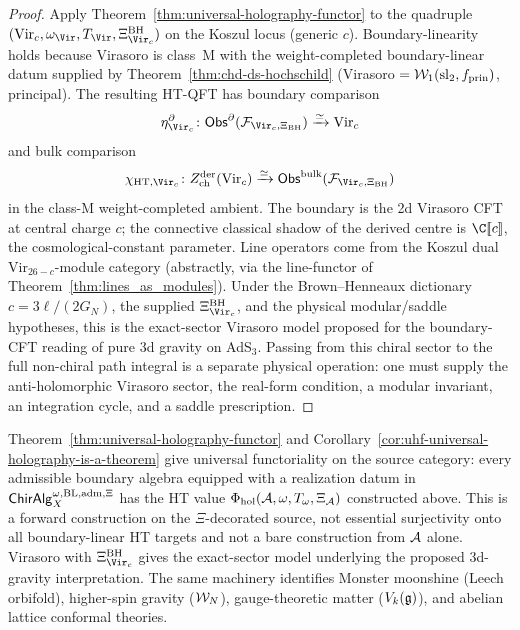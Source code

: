 \begin{proof}
Apply Theorem~\ref{thm:universal-holography-functor} to the
quadruple
\((\mathrm{Vir}_c,\omega_{\Vir},T_{\Vir},
\Xi_{\Vir_c}^{\mathrm{BH}})\) on the Koszul locus (generic \(c\)).
Boundary-linearity holds because Virasoro is class~M with the
weight-completed boundary-linear datum supplied by
Theorem~\ref*{thm:chd-ds-hochschild}
(Virasoro \(=\mathcal{W}_1(\mathrm{sl}_2,f_{\mathrm{prin}})\), principal).
The resulting HT-QFT has boundary comparison
\[
\eta^\partial_{\Vir_c}\colon
\Obs^\partial(\cF_{\Vir_c,\Xi_{\mathrm{BH}}})
\xrightarrow{\simeq}\mathrm{Vir}_c
\]
and bulk comparison
\[
\chi_{\mathrm{HT},\Vir_c}\colon
\Zder(\mathrm{Vir}_c)\xrightarrow{\simeq}
\Obs^{\mathrm{bulk}}(\cF_{\Vir_c,\Xi_{\mathrm{BH}}})
\]
in the class-M weight-completed ambient. The boundary is the 2d
Virasoro CFT at central charge \(c\); the connective classical shadow
of the derived centre is \(\C[\![c]\!]\), the cosmological-constant
parameter. Line operators come from the Koszul dual
\(\mathrm{Vir}_{26-c}\)-module category (abstractly, via the
line-functor of Theorem~\ref*{thm:lines_as_modules}). Under the
Brown--Henneaux dictionary \(c = 3\ell/(2G_N)\), the supplied
\(\Xi_{\Vir_c}^{\mathrm{BH}}\), and the physical modular/saddle
hypotheses, this is the exact-sector Virasoro model proposed for the
boundary-CFT reading of pure 3d gravity on AdS$_3$.  Passing from this
chiral sector to the full non-chiral path integral is a separate
physical operation: one must supply the anti-holomorphic Virasoro
sector, the real-form condition, a modular invariant, an integration
cycle, and a saddle prescription.
\end{proof}

\begin{remark}
\label{rem:uhf-gravity-functorial-form}
Theorem~\ref{thm:universal-holography-functor} and
Corollary~\ref{cor:uhf-universal-holography-is-a-theorem} give
universal functoriality on the source category: every admissible
boundary algebra equipped with a realization datum in
$\mathsf{ChirAlg}^{\omega,\mathrm{BL,adm},\Xi}_X$ has the HT value
\(\Phi_{\mathrm{hol}}(\mathcal{A},\omega,T_\omega,\Xi_{\mathcal{A}})\) constructed
above. This is a forward construction on the \(\Xi\)-decorated
source, not essential surjectivity onto all boundary-linear HT
targets and not a bare construction from \(\mathcal{A}\) alone. Virasoro with
\(\Xi_{\Vir_c}^{\mathrm{BH}}\) gives the exact-sector model
underlying the proposed 3d-gravity interpretation.
The same machinery identifies
Monster moonshine (Leech orbifold), higher-spin gravity
($\mathcal{W}_N$), gauge-theoretic matter ($V_k(\mathfrak{g})$), and abelian
lattice conformal theories.
\end{remark}


